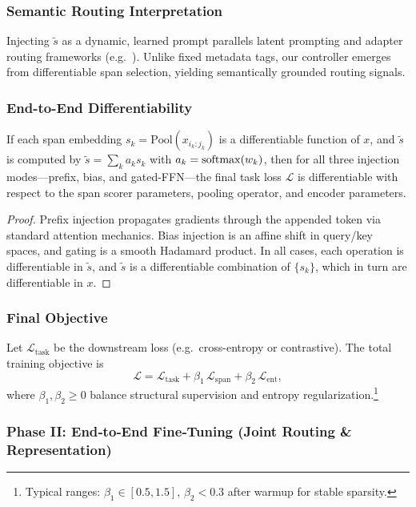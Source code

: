 \subsubsection{Semantic Routing Interpretation}
Injecting \(\tilde{s}\) as a dynamic, learned prompt parallels latent prompting and adapter routing frameworks (e.g.\ \cite{raffel2020exploring,liu2022pada,gupta2022molt}).  Unlike fixed metadata tags, our controller emerges from differentiable span selection, yielding semantically grounded routing signals.

\subsubsection{End-to-End Differentiability}
\begin{proposition}
	\label{prop:controller_diff}
	If each span embedding \(s_k=\mathrm{Pool}(x_{i_k:j_k})\) is a differentiable function of \(x\), and \(\tilde{s}\) is computed by
	\(\tilde{s}=\sum_k a_k s_k\) with \(a_k=\mathrm{softmax}(w_k)\), then for all three injection modes—prefix, bias, and gated-FFN—the final task loss \(\mathcal{L}\) is differentiable with respect to the span scorer parameters, pooling operator, and encoder parameters.
\end{proposition}
\begin{proof}
	Prefix injection propagates gradients through the appended token via standard attention mechanics.  Bias injection is an affine shift in query/key spaces, and gating is a smooth Hadamard product.  In all cases, each operation is differentiable in \(\tilde{s}\), and \(\tilde{s}\) is a differentiable combination of \(\{s_k\}\), which in turn are differentiable in \(x\).  
\end{proof}

\subsubsection{Final Objective}
Let \(\mathcal{L}_{\mathrm{task}}\) be the downstream loss (e.g.\ cross-entropy or contrastive).  The total training objective is
\[
\mathcal{L}
= \mathcal{L}_{\mathrm{task}}
+ \beta_1\,\mathcal{L}_{\mathrm{span}}
+ \beta_2\,\mathcal{L}_{\mathrm{ent}},
\]
where \(\beta_1,\beta_2\ge0\) balance structural supervision and entropy regularization.\footnote{Typical ranges: \(\beta_1\in[0.5,1.5]\), \(\beta_2<0.3\) after warmup for stable sparsity.}

\subsubsection*{Phase II: End‐to‐End Fine‐Tuning (Joint Routing \& Representation)}

